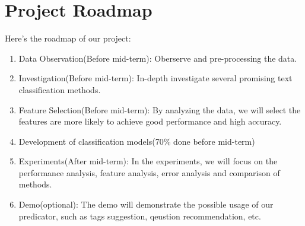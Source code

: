 \documentclass{article} %
\begin{document}
\section{Project Roadmap}
Here's the roadmap of our project:
\begin{enumerate}
    \item Data Observation(Before mid-term): Oberserve and pre-processing the data.
    \item Investigation(Before mid-term): In-depth investigate several promising text classification methods.
    \item Feature Selection(Before mid-term): By analyzing the data, we will select the features are more likely to achieve good performance and high accuracy.
    \item Development of classification models(70\% done before mid-term)
    \item Experiments(After mid-term): In the experiments, we will focus on the performance analysis, feature analysis, error analysis and comparison of methods.
    \item Demo(optional): The demo will demonstrate the possible usage of our predicator, such as tags suggestion, qeustion recommendation, etc.
\end{enumerate}
\end{document}
